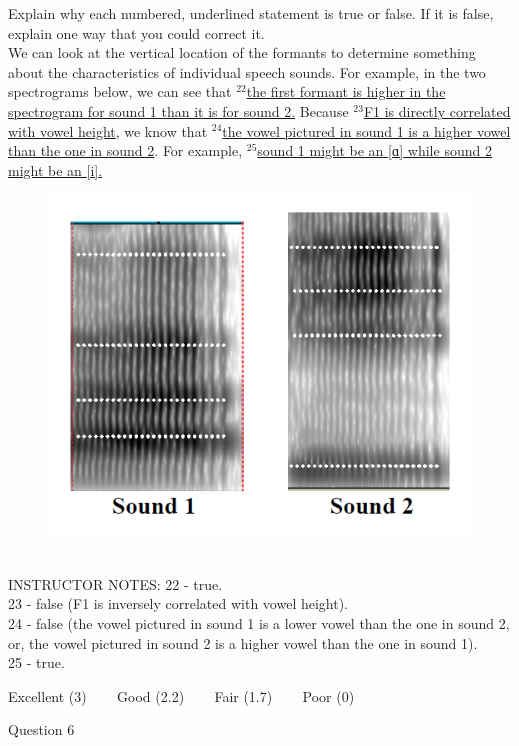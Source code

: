 \documentclass[12pt]{article}
\begin{document}
Explain why each numbered, underlined statement is true or false. If it is false, explain one way that you could correct it.\\

We can look at the vertical location of the formants to determine something about the characteristics of individual speech sounds. For example, in the two spectrograms below, we can see that $^{22}$\ul{the first formant is higher in the spectrogram for sound 1 than it is for sound 2.} Because $^{23}$\ul{F1 is directly correlated with vowel height}, we know that $^{24}$\ul{the vowel pictured in sound 1 is a higher vowel than the one in sound 2}. For example, $^{25}$\ul{sound 1 might be an {[ɑ]} while sound 2 might be an {[i]}.}

\begin{figure}[H]
\includegraphics{../images/sound1a_sound2i.png}
\end{figure}

~\\
INSTRUCTOR NOTES: 22 - true. \\23 - false (F1 is inversely correlated with vowel height). \\24 - false (the vowel pictured in sound 1 is a lower vowel than the one in sound 2, or, the vowel pictured in sound 2 is a higher vowel than the one in sound 1).\\25 - true.


\vfill
Excellent (3) ~~~ Good (2.2) ~~~ Fair (1.7) ~~~ Poor (0)
\newpage

{\large Question 6}\\
\end{document}
